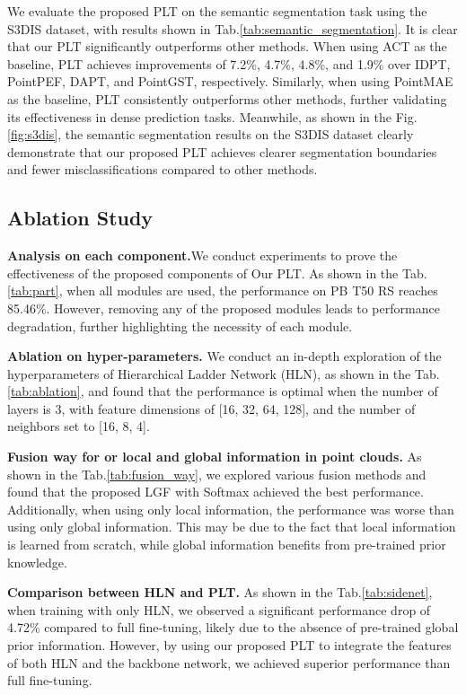 We evaluate the proposed PLT on the semantic segmentation task using the S3DIS dataset\cite{armeni20163d}, with results shown in Tab.\ref{tab:semantic_segmentation}. It is clear that our PLT significantly outperforms other methods. When using ACT as the baseline, PLT achieves improvements of 7.2\%, 4.7\%, 4.8\%, and 1.9\% over IDPT, PointPEF, DAPT, and PointGST, respectively. Similarly, when using PointMAE as the baseline, PLT consistently outperforms other methods, further validating its effectiveness in dense prediction tasks. Meanwhile, as shown in the Fig.\ref{fig:s3dis}, the semantic segmentation results on the S3DIS dataset clearly demonstrate that our proposed PLT achieves clearer segmentation boundaries and fewer misclassifications compared to other methods.











\subsection{Ablation Study}

\textbf{Analysis on each component.}We conduct experiments to prove the effectiveness of the proposed components of Our PLT. As shown in the Tab.\ref{tab:part}, when all modules are used, the performance on PB T50 RS reaches 85.46\%. However, removing any of the proposed modules leads to performance degradation, further highlighting the necessity of each module.

\textbf{Ablation on hyper-parameters.} We conduct an in-depth exploration of the hyperparameters of Hierarchical Ladder Network (HLN), as shown in the Tab.\ref{tab:ablation}, and found that the performance is optimal when the number of layers is 3, with feature dimensions of [16, 32, 64, 128], and the number of neighbors set to [16, 8, 4].

\textbf{Fusion way for or local and global information in point clouds.} As shown in the Tab.\ref{tab:fusion_way}, we explored various fusion methods and found that the proposed LGF with Softmax achieved the best performance. Additionally, when using only local information, the performance was worse than using only global information. This may be due to the fact that local information is learned from scratch, while global information benefits from pre-trained prior knowledge.

\textbf{Comparison between HLN and PLT.} As shown in the Tab.\ref{tab:sidenet}, when training with only HLN, we observed a significant performance drop of 4.72\% compared to full fine-tuning, likely due to the absence of pre-trained global prior information. However, by using our proposed PLT to integrate the features of both HLN and the backbone network, we achieved superior performance than full fine-tuning.

